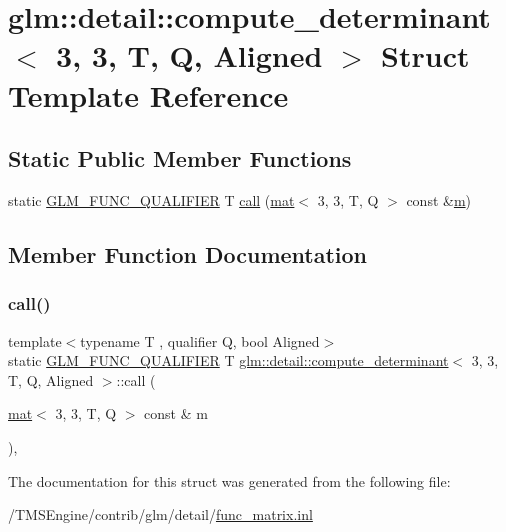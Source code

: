 \hypertarget{structglm_1_1detail_1_1compute__determinant_3_013_00_013_00_01_t_00_01_q_00_01_aligned_01_4}{}\section{glm\+:\+:detail\+:\+:compute\+\_\+determinant$<$ 3, 3, T, Q, Aligned $>$ Struct Template Reference}
\label{structglm_1_1detail_1_1compute__determinant_3_013_00_013_00_01_t_00_01_q_00_01_aligned_01_4}
\subsection*{Static Public Member Functions}
\begin{DoxyCompactItemize}
\item 
static \hyperlink{setup_8hpp_a33fdea6f91c5f834105f7415e2a64407}{G\+L\+M\+\_\+\+F\+U\+N\+C\+\_\+\+Q\+U\+A\+L\+I\+F\+I\+ER} T \hyperlink{structglm_1_1detail_1_1compute__determinant_3_013_00_013_00_01_t_00_01_q_00_01_aligned_01_4_a768a144449ee7bbf69cdefe9896f1ceb}{call} (\hyperlink{structglm_1_1mat}{mat}$<$ 3, 3, T, Q $>$ const \&\hyperlink{_s_d_l__opengl__glext_8h_af593500c283bf1a787a6f947f503a5c2}{m})
\end{DoxyCompactItemize}


\subsection{Member Function Documentation}
\mbox{\label{structglm_1_1detail_1_1compute__determinant_3_013_00_013_00_01_t_00_01_q_00_01_aligned_01_4_a768a144449ee7bbf69cdefe9896f1ceb}} 
\subsubsection{\texorpdfstring{call()}{call()}}
{\footnotesize\ttfamily template$<$typename T , qualifier Q, bool Aligned$>$ \\
static \hyperlink{setup_8hpp_a33fdea6f91c5f834105f7415e2a64407}{G\+L\+M\+\_\+\+F\+U\+N\+C\+\_\+\+Q\+U\+A\+L\+I\+F\+I\+ER} T \hyperlink{structglm_1_1detail_1_1compute__determinant}{glm\+::detail\+::compute\+\_\+determinant}$<$ 3, 3, T, Q, Aligned $>$\+::call (\begin{DoxyParamCaption}\item[{\hyperlink{structglm_1_1mat}{mat}$<$ 3, 3, T, Q $>$ const \&}]{m }\end{DoxyParamCaption})\hspace{0.3cm}{\ttfamily [inline]}, {\ttfamily [static]}}



The documentation for this struct was generated from the following file\+:\begin{DoxyCompactItemize}
\item 
/\+T\+M\+S\+Engine/contrib/glm/detail/\hyperlink{func__matrix_8inl}{func\+\_\+matrix.\+inl}\end{DoxyCompactItemize}
